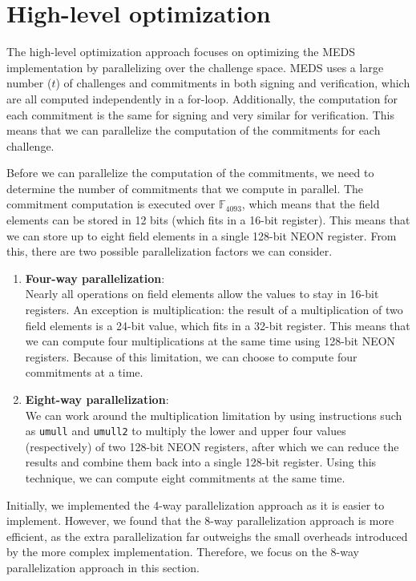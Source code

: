 \documentclass[11pt,a4paper]{report}
\theoremstyle{definition}
\begin{document}
\section{High-level optimization}
\label{sec:highleveloptimization}
The high-level optimization approach focuses on optimizing the MEDS implementation by parallelizing over the challenge space. MEDS uses a large number ($t$) of challenges and commitments in both signing and verification, which are all computed independently in a for-loop. Additionally, the computation for each commitment is the same for signing and very similar for verification. This means that we can parallelize the computation of the commitments for each challenge.

Before we can parallelize the computation of the commitments, we need to determine the number of commitments that we compute in parallel. The commitment computation is executed over $\mathbb{F}_{4093}$, which means that the field elements can be stored in 12 bits (which fits in a 16-bit register). This means that we can store up to eight field elements in a single 128-bit NEON register. From this, there are two possible parallelization factors we can consider.
\begin{enumerate}
  \item \textbf{Four-way parallelization}:\\
        Nearly all operations on field elements allow the values to stay in 16-bit registers. An exception is multiplication: the result of a multiplication of two field elements is a 24-bit value, which fits in a 32-bit register. This means that we can compute four multiplications at the same time using 128-bit NEON registers. Because of this limitation, we can choose to compute four commitments at a time.
  \item \textbf{Eight-way parallelization}:\\
        We can work around the multiplication limitation by using instructions such as \texttt{umull} and \texttt{umull2} to multiply the lower and upper four values (respectively) of two 128-bit NEON registers, after which we can reduce the results and combine them back into a single 128-bit register. Using this technique, we can compute eight commitments at the same time.
\end{enumerate}
Initially, we implemented the 4-way parallelization approach as it is easier to implement. However, we found that the 8-way parallelization approach is more efficient, as the extra parallelization far outweighs the small overheads introduced by the more complex implementation. Therefore, we focus on the 8-way parallelization approach in this section.
\end{document}
